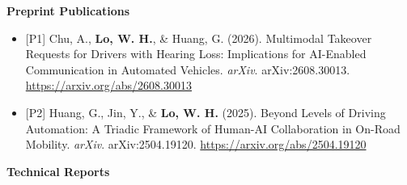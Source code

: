\documentclass[11pt]{article}
\begin{document}
\vspace{0.6em}


\textbf{Preprint Publications}

\begin{itemize}[leftmargin=*, topsep=0pt, itemsep=6pt]

  \item \begin{samepage}{[P1]} Chu, A., \textbf{Lo, W. H.}, \& Huang, G. (2026). Multimodal Takeover Requests for Drivers with Hearing Loss: Implications for AI-Enabled Communication in Automated Vehicles. \textit{arXiv}. arXiv:2608.30013. \href{https://arxiv.org/abs/2608.30013}{\url{https://arxiv.org/abs/2608.30013}}
  \par\end{samepage}

  \item \begin{samepage}{[P2]} Huang, G., Jin, Y., \& \textbf{Lo, W. H.} (2025). Beyond Levels of Driving Automation: A Triadic Framework of Human-AI Collaboration in On-Road Mobility. \textit{arXiv}. arXiv:2504.19120. \href{https://arxiv.org/abs/2504.19120}{\url{https://arxiv.org/abs/2504.19120}}
  \par\end{samepage}

\end{itemize}

\vspace{0.6em}


\textbf{Technical Reports}
\end{document}
